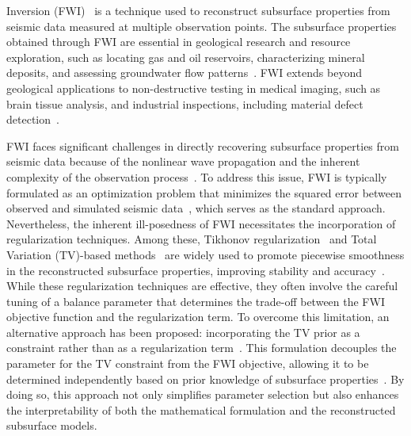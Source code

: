  Inversion (FWI)~\cite{FWI0,FWI1} is a technique used to reconstruct subsurface properties from seismic data measured at multiple observation points.
The subsurface properties obtained through FWI are essential in geological research and resource exploration, such as locating gas and oil reservoirs, characterizing mineral deposits, and assessing groundwater flow patterns~\cite{FWI1,FWIApplicationGroundwater0,FWIApplicationGroundwater1}.
FWI extends beyond geological applications to non-destructive testing in medical imaging, such as brain tissue analysis, and industrial inspections, including material defect detection~\cite{FWIApplicationNonDestructiveTesting0,FWIApplicationNonDestructiveTesting1}.

FWI faces significant challenges in directly recovering subsurface properties from seismic data because of the nonlinear wave propagation and the inherent complexity of the observation process~\cite{FWI1}.
To address this issue, FWI is typically formulated as an optimization problem that minimizes the squared error between observed and simulated seismic data~\mbox{\cite{FWI0,CustomFWI0,CustomFWI1,CustomFWI2,CustomFWI3,CustomFWI4,CustomFWI5}}, which serves as the standard approach.
Nevertheless, the inherent ill-posedness of FWI necessitates the incorporation of regularization techniques.
Among these, Tikhonov regularization~\cite{tikhonov} and Total Variation (TV)-based methods~\cite{TV,TGV} are widely used to promote piecewise smoothness in the reconstructed subsurface properties, improving stability and accuracy~\cite{FWI-with-tikhonov-regularization,FWI-with-TV-regularization,FWI-with-directional-TV-regularization,FWI-with-high-order-TV-regularization,FWI-with-TGV-regularization}.
While these regularization techniques are effective, they often involve the careful tuning of a balance parameter that determines the trade-off between the FWI objective function and the regularization term.
To overcome this limitation, an alternative approach has been proposed: incorporating the TV prior as a constraint rather than as a regularization term~\cite{FWI-with-TV-constraint,FWI-with-TV-constraint2,FWI-with-TV-constraint3,FWI-with-TV-constraint4}.
This formulation decouples the parameter for the TV constraint from the FWI objective, allowing it to be determined independently based on prior knowledge of subsurface properties~\cite{constraint0,constraint1,constraint2,constraint3,constraint4,constraints-vs-penalties-in-FWI}.
By doing so, this approach not only simplifies parameter selection but also enhances the interpretability of both the mathematical formulation and the reconstructed subsurface models.

